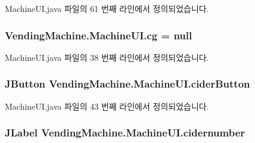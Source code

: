 Machine\+U\+I.\+java 파일의 61 번째 라인에서 정의되었습니다.

\subsubsection[{\texorpdfstring{cg}{cg}}]{ Vending\+Machine.\+Machine\+U\+I.\+cg = null\hspace{0.3cm}{\ttfamily [private]}}\hypertarget{class_vending_machine_1_1_machine_u_i_a3aacb919b7c540d71bb398666f03dc08}{}\label{class_vending_machine_1_1_machine_u_i_a3aacb919b7c540d71bb398666f03dc08}


Machine\+U\+I.\+java 파일의 38 번째 라인에서 정의되었습니다.

\subsubsection[{\texorpdfstring{cider\+Button}{ciderButton}}]{\setlength{\rightskip}{0pt plus 5cm}J\+Button Vending\+Machine.\+Machine\+U\+I.\+cider\+Button\hspace{0.3cm}{\ttfamily [private]}}\hypertarget{class_vending_machine_1_1_machine_u_i_a1e0af12bb99a608674652aa9b19b5c1a}{}\label{class_vending_machine_1_1_machine_u_i_a1e0af12bb99a608674652aa9b19b5c1a}


Machine\+U\+I.\+java 파일의 43 번째 라인에서 정의되었습니다.

\subsubsection[{\texorpdfstring{cidernumber}{cidernumber}}]{\setlength{\rightskip}{0pt plus 5cm}J\+Label Vending\+Machine.\+Machine\+U\+I.\+cidernumber\hspace{0.3cm}{\ttfamily [private]}}\hypertarget{class_vending_machine_1_1_machine_u_i_a3186776304413f89f2ca3e0fcf56947b}{}\label{class_vending_machine_1_1_machine_u_i_a3186776304413f89f2ca3e0fcf56947b}



